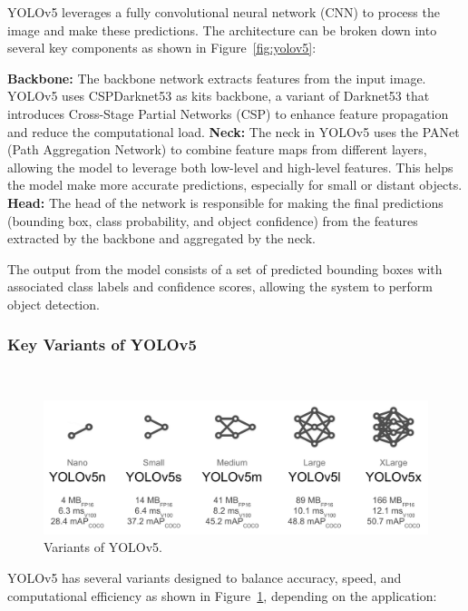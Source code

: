 \documentclass[letterpaper, 10 pt, conference]{ieeeconf}
\begin{document}
YOLOv5 leverages a fully convolutional neural network (CNN) to process the image and make these predictions. The architecture can be broken down into several key components as shown in Figure~\ref{fig:yolov5}:

\textbf{Backbone:}
The backbone network extracts features from the input image. YOLOv5 uses CSPDarknet53 as kits backbone, a variant of Darknet53 that introduces Cross-Stage Partial Networks (CSP) to enhance feature propagation and reduce the computational load.
\textbf{Neck:}
The neck in YOLOv5 uses the PANet (Path Aggregation Network) to combine feature maps from different layers, allowing the model to leverage both low-level and high-level features. This helps the model make more accurate predictions, especially for small or distant objects.
\textbf{Head:}
The head of the network is responsible for making the final predictions (bounding box, class probability, and object confidence) from the features extracted by the backbone and aggregated by the neck.


The output from the model consists of a set of predicted bounding boxes with associated class labels and confidence scores, allowing the system to perform object detection.

\subsubsection{Key Variants of YOLOv5}\

\begin{figure}[!t]
    \centering
    \includegraphics[width=0.9\linewidth]{figures/many_yolo.png} 
    \caption{Variants of YOLOv5.}
    \label{fig:many_yolo}
\end{figure}

YOLOv5 has several variants designed to balance accuracy, speed, and computational efficiency as shown in Figure~\ref{fig:many_yolo}, depending on the application:
\end{document}
